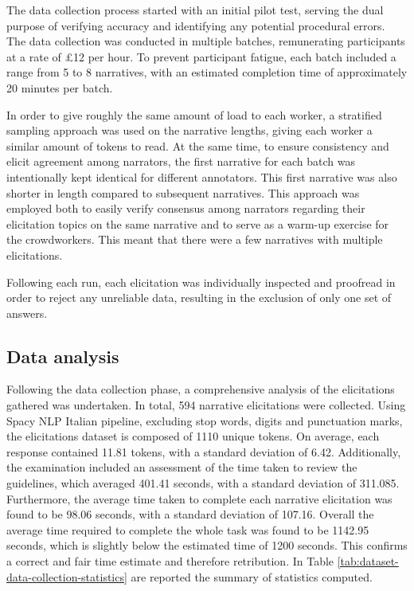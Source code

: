 The data collection process started with an initial pilot test, serving the dual purpose of verifying accuracy and identifying any potential procedural errors. The data collection was conducted in multiple batches, remunerating participants at a rate of £12 per hour. To prevent participant fatigue, each batch included a range from 5 to 8 narratives, with an estimated completion time of approximately 20 minutes per batch.

In order to give roughly the same amount of load to each worker, a stratified sampling approach was used on the narrative lengths, giving each worker a similar amount of tokens to read. At the same time, to ensure consistency and elicit agreement among narrators, the first narrative for each batch was intentionally kept identical for different annotators. This first narrative was also shorter in length compared to subsequent narratives. This approach was employed both to easily verify consensus among narrators regarding their elicitation topics on the same narrative and to serve as a warm-up exercise for the crowdworkers. This meant that there were a few narratives with multiple elicitations.

Following each run, each elicitation was individually inspected and proofread in order to reject any unreliable data, resulting in the exclusion of only one set of answers.


\subsection{Data analysis}


Following the data collection phase, a comprehensive analysis of the elicitations gathered was undertaken. In total, 594 narrative elicitations were collected. Using Spacy NLP Italian pipeline, excluding stop words, digits and punctuation marks, the elicitations dataset is composed of 1110 unique tokens. On average, each response contained 11.81 tokens, with a standard deviation of 6.42. Additionally, the examination included an assessment of the time taken to review the guidelines, which averaged 401.41 seconds, with a standard deviation of 311.085. Furthermore, the average time taken to complete each narrative elicitation was found to be 98.06 seconds, with a standard deviation of 107.16. Overall the average time required to complete the whole task was found to be 1142.95 seconds, which is slightly below the estimated time of 1200 seconds. This confirms a correct and fair time estimate and therefore retribution. In Table \ref{tab:dataset-data-collection-statistics} are reported the summary of statistics computed. 

